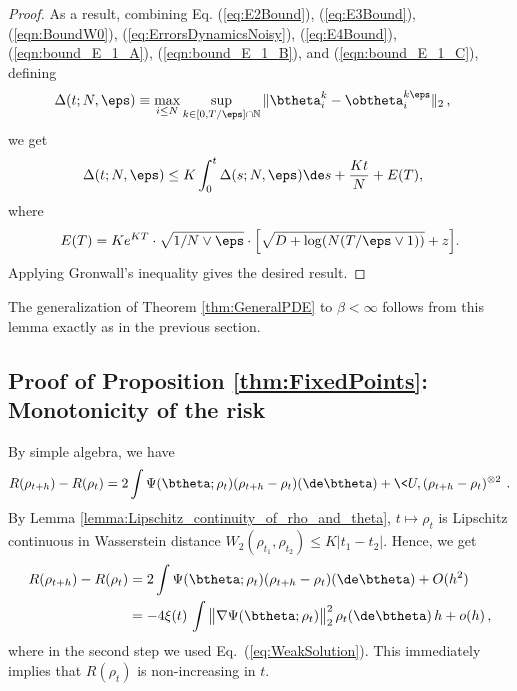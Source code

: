 \documentclass[11pt]{article}
\begin{document}
\begin{proof}
As a result, combining Eq. (\ref{eq:E2Bound}), (\ref{eq:E3Bound}), (\ref{eqn:BoundW0}), (\ref{eq:ErrorsDynamicsNoisy}), (\ref{eq:E4Bound}), (\ref{eqn:bound_E_1_A}), (\ref{eqn:bound_E_1_B}), and (\ref{eqn:bound_E_1_C}), defining
\begin{align}
\Delta(t;N,\eps) &\equiv \max_{i \le N}\sup_{k \in [0, T/\eps] \cap \mathbb N}\|\btheta^{k}_i-\obtheta^{k\eps}_i\|_2\,,
\end{align}
we get 
\begin{equation}
\begin{aligned}
\Delta(t;N,\eps) &\le K\int_0^t\Delta(s;N,\eps) \de s + \frac{Kt}{N} + E(T),
\end{aligned}
\end{equation}
where
\begin{equation}
E(T) = K e^{KT} \cdot \sqrt{1/N \vee \eps } \cdot \Big[\sqrt{D + \log (N (T/ \eps \vee 1) )} + z \Big]. 
\end{equation}
Applying Gronwall's inequality gives the desired result. 

\end{proof}

The generalization of Theorem \ref{thm:GeneralPDE} to $\beta<\infty$ follows from this lemma exactly as in the previous section.

\subsection{Proof of Proposition \ref{thm:FixedPoints}: Monotonicity of the risk}


By simple algebra, we have 
%
\begin{align}
%
R(\rho_{t+h})-R(\rho_t) = 2\int \Psi(\btheta;\rho_t)  (\rho_{t+h}-\rho_t)(\de\btheta) +\<U,  (\rho_{t+h}-\rho_t)^{\otimes 2}\>\, .
%
\end{align}
%
By Lemma \ref{lemma:Lipschitz_continuity_of_rho_and_theta}, $t\mapsto \rho_t$ is Lipschitz continuous in Wasserstein distance
$W_2(\rho_{t_1},\rho_{t_2}) \le K|t_1-t_2|$. Hence, we get
%
\begin{align}
%
R(\rho_{t+h})-R(\rho_t) &= 2\int \Psi(\btheta;\rho_t)  (\rho_{t+h}-\rho_t)(\de\btheta) + O(h^2)\\
& = - 4\xi(t) \, \int \big\|\nabla \Psi(\btheta;\rho_t)\big\|_2^2\,\rho_t(\de\btheta)\, h+o(h)\, ,
%
\end{align}
%
where in the second step we used Eq.~(\ref{eq:WeakSolution}). This immediately implies that $R(\rho_t)$ is non-increasing in $t$. 
\end{document}
